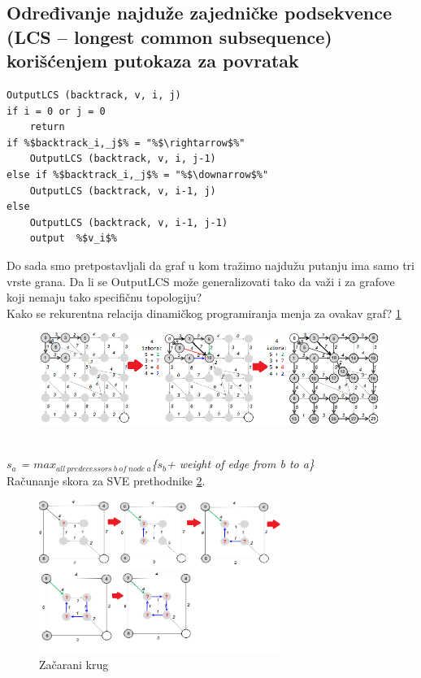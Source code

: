 \subsection{Određivanje najduže zajedničke podsekvence (LCS – longest common subsequence) korišćenjem putokaza za povratak}

\begin{lstlisting}
OutputLCS (backtrack, v, i, j)
if i = 0 or j = 0
    return
if %$backtrack_i,_j$% = "%$\rightarrow$%"
    OutputLCS (backtrack, v, i, j-1)
else if %$backtrack_i,_j$% = "%$\downarrow$%"
    OutputLCS (backtrack, v, i-1, j)
else
    OutputLCS (backtrack, v, i-1, j-1)
    output  %$v_i$%
\end{lstlisting}

Do sada smo pretpostavljali da graf u kom tražimo
najdužu putanju ima samo tri vrste grana. Da li se OutputLCS može generalizovati tako da važi i za grafove koji nemaju tako specifičnu
topologiju?\\
Kako se rekurentna relacija dinamičkog programiranja menja za ovakav graf? \ref{slika:rekRel}
\begin{figure}[h]
\centering
\includegraphics[width=\textwidth]{poglavlja/5/slike/rekurentaRelDinProg.png}
\caption{}
\label{slika:rekRel}
\end{figure}
\\

\textit{$s_a$ = $max_{all\ predecessors\ b\ of\ node\ a}$\{$s_b$+ weight of edge from b to a\}}
\\

Računanje skora za SVE prethodnike \ref{slika:racunanje}.

\begin{figure}[h]
\centering
\includegraphics[width=0.7\textwidth]{poglavlja/5/slike/racunanje.png}
\caption{Začarani krug}
\label{slika:racunanje}
\end{figure}

